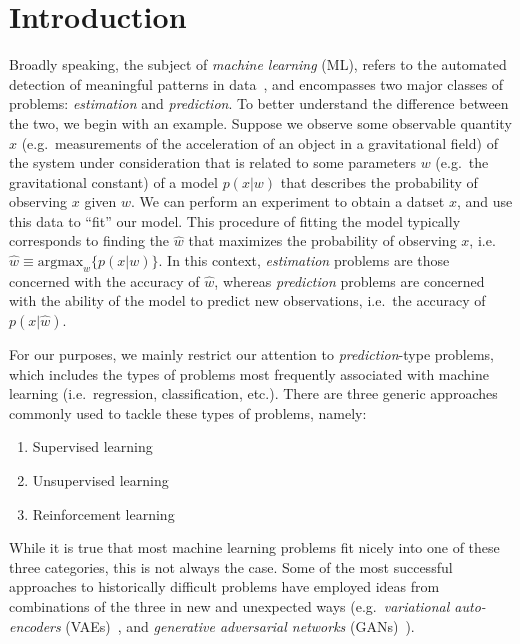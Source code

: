 \documentclass[../main.tex]{subfiles}
\begin{document}
\section{Introduction}
Broadly speaking, the subject of \emph{machine learning} (ML), refers to the automated detection of meaningful patterns
in data~\cite{shalev2014understanding}, and encompasses two major classes of problems: \emph{estimation} and
\emph{prediction}. 
%
%
To better understand the difference between the two, we begin with an example.
%
Suppose we observe some observable quantity $x$ (e.g.\ measurements of the acceleration of an object in a
gravitational field) of the system under consideration that is related to some parameters $w$ (e.g.\ the
gravitational constant) of a model $p (x | w)$ that describes the probability of observing $x$ given
$w$.
%
We can perform an experiment to obtain a datset $x$, and use this data to ``fit'' our model. This procedure of
fitting the model typically corresponds to finding the $\hat w$ that maximizes the probability of observing
$x$, i.e.\ $\hat{w} \equiv \mathrm{argmax}_{w} \{p (x|w)\}$.
%
In this context, \emph{estimation} problems are those concerned with the accuracy of $\hat{w}$, whereas
\emph{prediction} problems are concerned with the ability of the model to predict new observations, i.e.\ the accuracy
of $p (x|\hat{w})$.

For our purposes, we mainly restrict our attention to \emph{prediction}-type problems, which includes the types of
problems most frequently associated with machine learning (i.e.\ regression, classification, etc.).
There are three generic approaches commonly used to tackle these types of problems, namely: 
%
\begin{enumerate}
  \item Supervised learning
  \item Unsupervised learning
  \item Reinforcement learning
\end{enumerate}
%
While it is true that most machine learning problems fit nicely into one of these three categories, this is not always
the case.
%
Some of the most successful approaches to historically difficult problems have employed ideas from combinations of the
three in new and unexpected ways (e.g.\ \emph{variational auto-encoders} (VAEs)~\cite{kingma2013auto}, and
\emph{generative adversarial networks} (GANs)~\cite{goodfellow2014generative}).
\end{document}
